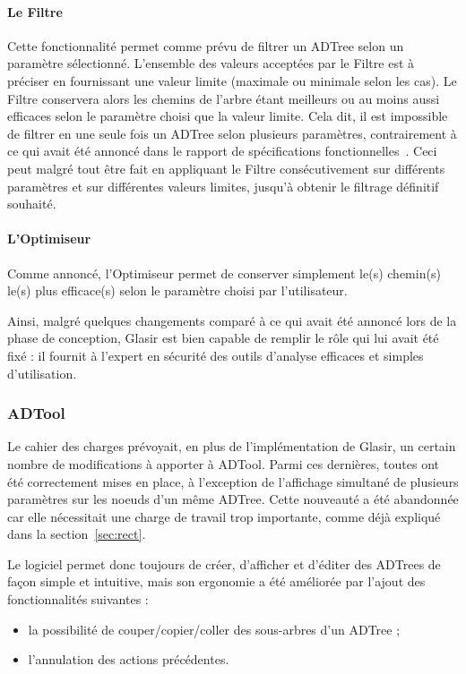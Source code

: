 \paragraph{Le Filtre} Cette fonctionnalité permet comme prévu de filtrer un ADTree selon un paramètre sélectionné. L'ensemble des valeurs acceptées par le Filtre est à préciser en fournissant une valeur limite (maximale ou minimale selon les cas). Le Filtre conservera alors les chemins de l'arbre étant meilleurs ou au moins aussi efficaces selon le paramètre choisi que la valeur limite. Cela dit, il est impossible de filtrer en une seule fois un ADTree selon plusieurs paramètres, contrairement à ce qui avait été annoncé dans le rapport de spécifications fonctionnelles~\cite{spec_fonc}. Ceci peut malgré tout être fait en appliquant le Filtre consécutivement sur différents paramètres et sur différentes valeurs limites, jusqu'à obtenir le filtrage définitif souhaité.

\paragraph{L'Optimiseur} Comme annoncé, l'Optimiseur permet de conserver simplement le(s) chemin(s) le(s) plus efficace(s) selon le paramètre choisi par l'utilisateur. 

Ainsi, malgré quelques changements comparé à ce qui avait été annoncé lors de la phase de conception, Glasir est bien capable de remplir le rôle qui lui avait été fixé :  il fournit à l'expert en sécurité des outils d'analyse efficaces et simples d'utilisation.

\subsubsection{ADTool}
\label{sssec:obj_adtool}

Le cahier des charges prévoyait, en plus de l'implémentation de Glasir, un certain nombre de modifications à apporter à ADTool. Parmi ces dernières, toutes ont été correctement mises en place, à l'exception de l'affichage simultané de plusieurs paramètres sur les noeuds d'un même ADTree. Cette nouveauté a été abandonnée car elle nécessitait une charge de travail trop importante, comme déjà expliqué dans la {\sc section}~\ref{sec:rect}.

Le logiciel permet donc toujours de créer, d'afficher et d'éditer des ADTrees de façon simple et intuitive, mais son ergonomie a été améliorée par l'ajout des fonctionnalités suivantes :
\begin{itemize}
    \item la possibilité de couper/copier/coller des sous-arbres d'un ADTree ;
    \item l'annulation des actions précédentes.
\end{itemize}

